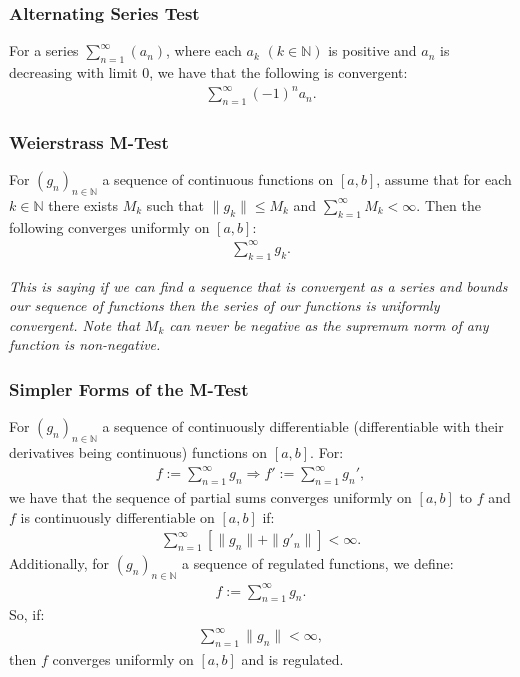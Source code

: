 \documentclass[a4paper, 12pt, twoside]{article}
\begin{document}
\subsubsection{Alternating Series Test}

For a series $\sum_{n = 1}^\infty(a_n)$, where each $a_k$ $(k\in\mathbb{N})$
is positive and $a_n$ is decreasing with limit $0$, we have that the following
is convergent:
\begin{align*}
      \sum_{n=1}^\infty(-1)^na_n.
\end{align*}

\subsubsection{Weierstrass M-Test}

For $(g_n)_{n\in\mathbb{N}}$ a sequence of continuous functions on $[a, b]$,
assume that for each $k\in\mathbb{N}$ there exists $M_k$ such that
$\|g_k\| \leq M_k$ and $\sum_{k = 1}^\infty M_k < \infty$. Then the following
converges uniformly on $[a, b]$:
\begin{align*}
      \sum_{k = 1}^\infty g_k.
\end{align*}

\textit{This is saying if we can find a sequence that is convergent as a series
      and bounds our sequence of functions then the series of our functions is
      uniformly convergent. Note that $M_k$ can never be negative as the
      supremum norm of any function is non-negative.}

\newpage

\subsubsection{Simpler Forms of the M-Test}

For $(g_n)_{n\in\mathbb{N}}$ a sequence of continuously differentiable (differentiable
with their derivatives being continuous) functions on $[a, b]$. For:
\begin{align*}
      f := \sum_{n = 1}^\infty g_n \Rightarrow f' := \sum_{n = 1}^\infty g_n',
\end{align*}
we have that the sequence of partial sums converges uniformly on $[a, b]$
to $f$ and $f$ is continuously differentiable on $[a, b]$ if:
\begin{align*}
      \sum_{n = 1}^\infty \left[\|g_n\| + \|g'_n\|\right] < \infty.
\end{align*}
Additionally, for $(g_n)_{n\in\mathbb{N}}$ a sequence of regulated functions,
we define:
\begin{align*}
      f := \sum_{n = 1}^\infty g_n.
\end{align*}
So, if:
\begin{align*}
      \sum_{n = 1}^\infty \|g_n\| < \infty,
\end{align*}
then $f$ converges uniformly on $[a, b]$ and is regulated.
\end{document}
